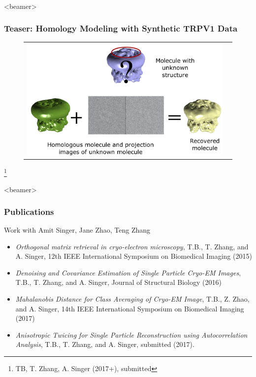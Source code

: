 \documentclass{beamer}
\newcommand\blfootnote[1]{%
  \begingroup
  \renewcommand\thefootnote{}\footnote{#1}%
  \addtocounter{footnote}{-1}%
  \endgroup
}
\begin{document}
\begin{frame}<beamer>
\frametitle{Teaser: Homology Modeling with Synthetic TRPV1 Data}
\begin{figure}[!htbp]
\begin{tabular}{cc}
\includegraphics[width=0.95\linewidth]{figures/trpv1_flowchart.pdf}\label{fig:simtrpv_emdb}
\end{tabular}
\end{figure}\blfootnote{TB, T. Zhang, A. Singer (2017+), submitted}
\end{frame}

\begin{frame}<beamer>
\frametitle{Publications}
Work with Amit Singer, Jane Zhao, Teng Zhang\\
\begin{itemize}
\item \tiny{\textit{Orthogonal matrix retrieval in cryo-electron microscopy}, T.B., T. Zhang, and A. Singer, 12th IEEE International Symposium on Biomedical Imaging (2015)}

\item \tiny{\textit{Denoising and Covariance Estimation of Single Particle Cryo-EM Images}, T.B., T. Zhang, and A. Singer, Journal of Structural Biology (2016)}

\item \textit{Mahalanobis Distance for Class Averaging of Cryo-EM Image}, T.B., Z. Zhao, and A. Singer, 14th IEEE International Symposium on Biomedical Imaging (2017)

\item \textit{Anisotropic Twicing for Single Particle Reconstruction using Autocorrelation Analysis}, T.B., T. Zhang, and A. Singer, submitted (2017).

\end{itemize}
\end{frame}
\end{document}
